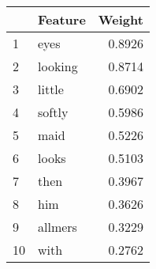 \begin{tabular}{llr}
\toprule
{} &  Feature &  Weight \\
\midrule
1  &     eyes &  0.8926 \\
2  &  looking &  0.8714 \\
3  &   little &  0.6902 \\
4  &   softly &  0.5986 \\
5  &     maid &  0.5226 \\
6  &    looks &  0.5103 \\
7  &     then &  0.3967 \\
8  &      him &  0.3626 \\
9  &  allmers &  0.3229 \\
10 &     with &  0.2762 \\
\bottomrule
\end{tabular}
